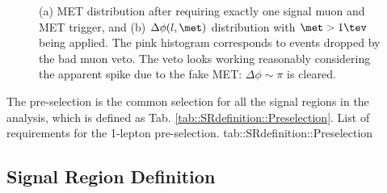 \begin{figure}[h]
  \centering
    \caption{(a) MET distribution after requiring exactly one signal muon and MET trigger, and (b) $\Delta \phi (l,\met)$ distribution with $\met>1\tev$ being applied. The pink histogram corresponds to events dropped by the bad muon veto. The veto looks working reasonably considering the apparent spike due to the fake MET: $\Delta \phi \sim \pi$ is cleared.}
    \label{fig::SRdefinition::badMuonVeto}
\end{figure}

The pre-selection is the common selection for all the signal regions in the analysis, which is defined as Tab. \ref{tab::SRdefinition::Preselection}.
{List of requirements for the 1-lepton pre-selection.}
{tab::SRdefinition::Preselection}

\subsection{Signal Region Definition}
